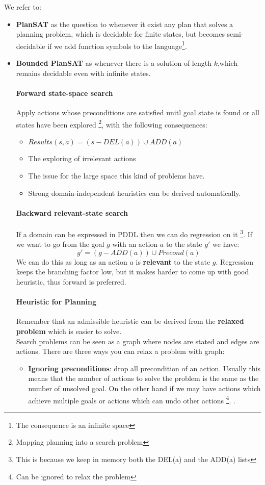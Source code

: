 \documentclass[5pt,a4paper]{article}
\begin{document}
We refer to:
\begin{itemize}
\item \textbf{PlanSAT} as the question to whenever it exist any plan that solves a planning problem, which is decidable for finite states, but becomes semi-decidable if we add function symbols to the language\footnote{The consequence is an infinite space}.
\item \textbf{Bounded PlanSAT} as whenever there is a solution of length $k$,which remains decidable even with infinite states.

\paragraph{Forward state-space search}
Apply actions whose preconditions are satisfied unitl goal state is found or all states have been explored \footnote{Mapping planning into a search problem}, with the following consequences:
\begin{itemize}
\item $Results(s,a)=(s-DEL(a))\cup ADD(a)$
\item The exploring of irrelevant actions
\item The issue for the large space this kind of problems have.
\item Strong domain-independent heuristics can be derived automatically.
\end{itemize}

\paragraph{Backward relevant-state search}
If a domain can be expressed in PDDL then we can do regression on it \footnote{This is because we keep in memory both the DEL(a) and the ADD(a) lists}. If we want to go from the goal $g$ with an action $a$ to the state $g'$ we have:
\[g'=(g-ADD(a)) \cup Precond(a)\]
We can do this as long as an action $a$ is \textbf{relevant} to the state $g$. Regression keeps the branching factor low, but it makes harder to come up with good heuristic, thus forward is preferred.


\paragraph{Heuristic for Planning}
Remember that an admissible heuristic can be derived from the \textbf{relaxed problem} which is easier to solve.\\
Search problems can be seen as a graph where nodes are stated and edges are actions. There are three ways you can relax a problem with graph:
\begin{itemize}
\item \textbf{Ignoring preconditions}: drop all precondition of an action. Usually this means that the number of actions to solve the problem is the same as the number of unsolved goal. On the other hand if we may have actions which achieve multiple goals or actions which  can undo other actions \footnote{Can be ignored to relax the problem}. .


\end{itemize}
\end{itemize}
\end{document}
